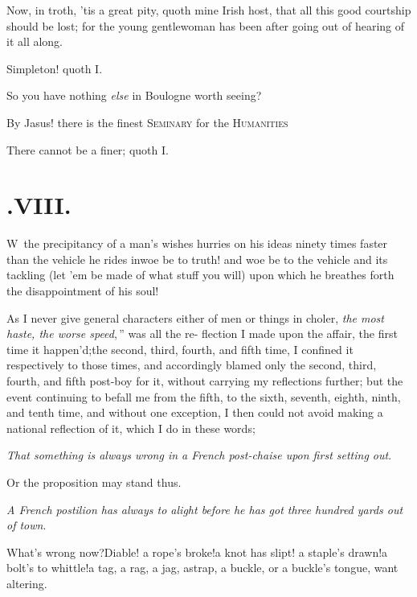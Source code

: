 \documentclass{article}
\begin{document}
\tsh Now, in troth, ’tis a great pity, quoth mine
Irish host, that all this good courtship should be lost; for
the young gentlewoman has been after going out of hearing of it all
along.\tsh

\tsh Simpleton! quoth I.

\tsh So you have nothing \textit{else} in Bou\-logne
worth seeing?

\tsk By Jasus! there is the finest \textsc{Seminary} for
the \textsc{Humanities}\tsh

\tsk There cannot be a finer; quoth I.

\section{.\enspace VIII.}

\lettrine{W}{\,} the precipitancy of a
man’s wishes hurries on his ideas ninety times faster than
the vehicle he rides in\tsk woe be to truth! and woe be to the
vehicle and its tackling (let ’em be made of what stuff you
will) upon which he breathes forth the disappointment of his
soul!

As I never give general characters either of men or things in
choler, \lqq\textit{the most haste, the worse speed},\,” was
all the re- flection I made upon the affair, the first time it
happen’d;\tsk the second, third, fourth, and fifth time, I
confined it respectively to those times, and accordingly blamed
only the second, third, fourth, and fifth post-boy for it, without
carrying my reflections further; but the event
continuing to befall me from the fifth, to the sixth, seventh,
eighth, ninth, and tenth time, and without one exception, I then
could not avoid making a national reflection of it, which I do in
these words;

\textit{That something is always wrong in a French post-chaise upon
first setting out}.

Or the proposition may stand thus.

\textit{A French postilion has always to alight before he has got
three hundred yards out of town}.

What’s wrong now?\tsh Diable!\tsh\break
a rope’s broke!\tsh a knot has slipt!\break
\tsh a staple’s drawn!\tsh a bolt’s to whittle!\tsh a tag, a
rag, a jag, a\break strap, a buckle, or a
buckle’s tongue, want altering.\tsh
\end{document}
